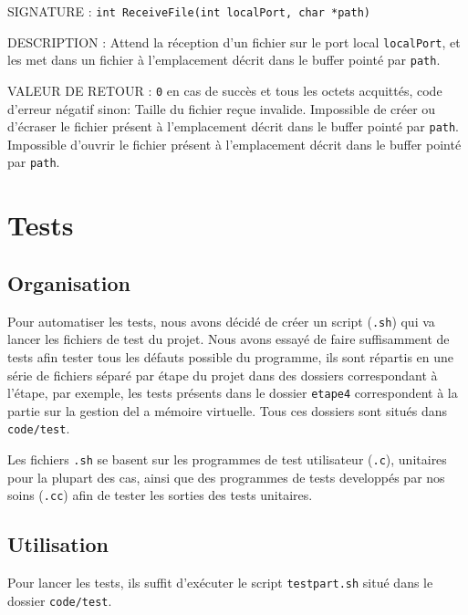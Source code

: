 \documentclass{article}
\begin{document}
		\begin{description}
			\item{SIGNATURE : } \texttt{int ReceiveFile(int localPort, char *path)}
			\item{DESCRIPTION : Attend la réception d'un fichier sur le port local \texttt{localPort}, et les met dans un fichier à l'emplacement décrit dans le buffer pointé par \texttt{path}.} 
			\item{VALEUR DE RETOUR : } \texttt{0} en cas de succès et tous les octets acquittés, code d'erreur négatif sinon: 
				 Taille du fichier reçue invalide.
				 Impossible de créer ou d'écraser le fichier présent à l'emplacement décrit dans le buffer pointé par \texttt{path}.
				 Impossible d'ouvrir le fichier présent à l'emplacement décrit dans le buffer pointé par \texttt{path}.
		\end{description}
		\vspace{2.5mm}

\section{Tests}
	\subsection{Organisation}
		{Pour automatiser les tests, nous avons décidé de créer un script (\texttt{.sh}) qui va lancer les fichiers de test du projet. Nous avons essayé de faire suffisamment de tests afin tester tous les défauts possible du programme, ils sont répartis en une série de fichiers séparé par étape du projet dans des dossiers correspondant à l'étape, par exemple, les tests présents dans le dossier \texttt{etape4} correspondent à la partie sur la gestion del a mémoire virtuelle. Tous ces dossiers sont situés dans \texttt{code/test}.}
		~\par{Les fichiers \texttt{.sh} se basent sur les programmes de test utilisateur (\texttt{.c}), unitaires pour la plupart des cas, ainsi que des programmes de tests developpés par nos soins (\texttt{.cc}) afin de tester les sorties des tests unitaires.}

	\subsection{Utilisation}
		{Pour lancer les tests, ils suffit d'exécuter le script \texttt{testpart.sh} situé dans le dossier \texttt{code/test}.}
\end{document}
